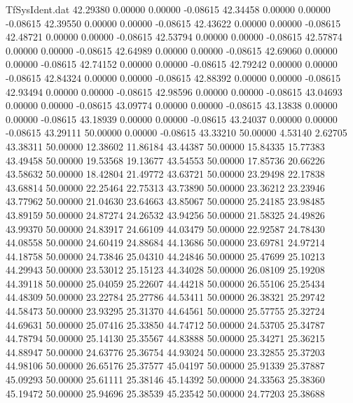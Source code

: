 \begin{filecontents}{TfSysIdent.dat}
  42.29380    0.00000    0.00000   -0.08615
  42.34458    0.00000    0.00000   -0.08615
  42.39550    0.00000    0.00000   -0.08615
  42.43622    0.00000    0.00000   -0.08615
  42.48721    0.00000    0.00000   -0.08615
  42.53794    0.00000    0.00000   -0.08615
  42.57874    0.00000    0.00000   -0.08615
  42.64989    0.00000    0.00000   -0.08615
  42.69060    0.00000    0.00000   -0.08615
  42.74152    0.00000    0.00000   -0.08615
  42.79242    0.00000    0.00000   -0.08615
  42.84324    0.00000    0.00000   -0.08615
  42.88392    0.00000    0.00000   -0.08615
  42.93494    0.00000    0.00000   -0.08615
  42.98596    0.00000    0.00000   -0.08615
  43.04693    0.00000    0.00000   -0.08615
  43.09774    0.00000    0.00000   -0.08615
  43.13838    0.00000    0.00000   -0.08615
  43.18939    0.00000    0.00000   -0.08615
  43.24037    0.00000    0.00000   -0.08615
  43.29111   50.00000    0.00000   -0.08615
  43.33210   50.00000    4.53140    2.62705
  43.38311   50.00000   12.38602   11.86184
  43.44387   50.00000   15.84335   15.77383
  43.49458   50.00000   19.53568   19.13677
  43.54553   50.00000   17.85736   20.66226
  43.58632   50.00000   18.42804   21.49772
  43.63721   50.00000   23.29498   22.17838
  43.68814   50.00000   22.25464   22.75313
  43.73890   50.00000   23.36212   23.23946
  43.77962   50.00000   21.04630   23.64663
  43.85067   50.00000   25.24185   23.98485
  43.89159   50.00000   24.87274   24.26532
  43.94256   50.00000   21.58325   24.49826
  43.99370   50.00000   24.83917   24.66109
  44.03479   50.00000   22.92587   24.78430
  44.08558   50.00000   24.60419   24.88684
  44.13686   50.00000   23.69781   24.97214
  44.18758   50.00000   24.73846   25.04310
  44.24846   50.00000   25.47699   25.10213
  44.29943   50.00000   23.53012   25.15123
  44.34028   50.00000   26.08109   25.19208
  44.39118   50.00000   25.04059   25.22607
  44.44218   50.00000   26.55106   25.25434
  44.48309   50.00000   23.22784   25.27786
  44.53411   50.00000   26.38321   25.29742
  44.58473   50.00000   23.93295   25.31370
  44.64561   50.00000   25.57755   25.32724
  44.69631   50.00000   25.07416   25.33850
  44.74712   50.00000   24.53705   25.34787
  44.78794   50.00000   25.14130   25.35567
  44.83888   50.00000   25.34271   25.36215
  44.88947   50.00000   24.63776   25.36754
  44.93024   50.00000   23.32855   25.37203
  44.98106   50.00000   26.65176   25.37577
  45.04197   50.00000   25.91339   25.37887
  45.09293   50.00000   25.61111   25.38146
  45.14392   50.00000   24.33563   25.38360
  45.19472   50.00000   25.94696   25.38539
  45.23542   50.00000   24.77203   25.38688

\end{filecontents}
